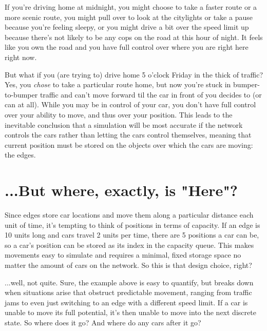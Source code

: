 \par If you're driving home at midnight, you might choose to take a faster route or a more scenic route, you might pull over to look at the citylights or take a pause because you're feeling sleepy, or you might drive a bit over the speed limit up because there's not likely to be any cops on the road at this hour of night.  It feels like you own the road and you have full control over where you are right here right now.  \\

\par But what if you (are trying to) drive home 5 o'clock Friday in the thick of traffic?  Yes, you \textit{chose} to take a particular route home, but now you're stuck in bumper-to-bumper traffic and can't move forward til the car in front of you decides to (or can at all).  While you may be in control of your car, you don't have full control over your ability to move, and thus over your position.  This leads to the inevitable conclusion that a simulation will be most accurate if the network controls the cars rather than letting the cars control themselves, meaning that current position must be stored on the objects over which the cars are moving:  the edges.

\section{...But where, exactly, is "Here"?}

\par Since edges store car locations and move them along a particular distance each unit of time, it's tempting to think of positions in terms of capacity.  If an edge is 10 units long and cars travel 2 units per time, there are 5 positions a car can be, so a car's position can be stored as its index in the capacity queue.  This makes movements easy to simulate and requires a minimal, fixed storage space no matter the amount of cars on the network.  So this is that design choice, right? \\

\par ...well, not quite.  Sure, the example above is easy to quantify, but breaks down when situations arise that obstruct predictable movement, ranging from traffic jams to even just switching to an edge with a different speed limit.  If a car is unable to move its full potential, it's then unable to move into the next discrete state.  So where does it go? And where do any cars after it go? \\

